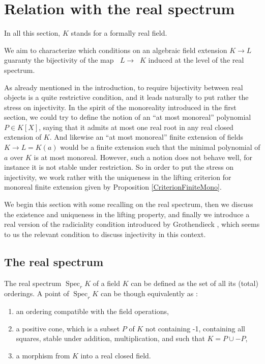 \documentclass[12pt]{amsart}
\theoremstyle{definition}
\DeclareMathOperator{\Sp}{Spec}
\DeclareMathOperator{\Spr}{Spec_r}
\begin{document}

\section{Relation with the real spectrum}\label{sec-sper}

In all this section, $K$ stands for a formally real field.

We aim to characterize which conditions on an algebraic field extension $K\to L$ guaranty the bijectivity of the map $\Spr L \to \Spr K$ induced at the level of the real spectrum.


As already mentioned in the introduction, to require bijectivity between real objects is a quite restrictive condition, and it leads naturally to put rather the stress on injectivity. In the spirit of the monoreality introduced in the first section, we could try  to define the notion of an 
``at most monoreal'' polynomial $P\in K[X]$, saying that it admits at most one real root in any real closed extension of $K$. And likewise an ``at most monoreal'' finite extension of fields $K\to L=K(a)$ would be a finite extension such that the minimal polynomial of $a$ over $K$ is at most monoreal. However, such a notion does not behave well, for instance it is not stable under restriction.
So in order to put the stress on injectivity, we work rather with the uniqueness in the lifting criterion for monoreal finite extension given by Proposition \ref{CriterionFiniteMono}. 

We begin this section with some recalling on the real spectrum, then we discuss the existence and uniqueness in the lifting property, and finally we introduce a real version of the radiciality condition introduced by Grothendieck \cite{Gr1}, which seems to us the relevant condition to discuss injectivity in this context.

\subsection{The real spectrum}

The real spectrum $\Sp_r K$ of a field $K$ can be defined as the set of all its (total) orderings. A point of $\Sp_r K$ can be though equivalently as :
\begin{enumerate}
\item an ordering compatible with the field operations, 
\item a positive cone, which is a subset $P$ of $K$ not containing -1, containing all squares, stable under addition, multiplication, and such that $K=P\cup -P$,  
\item a morphism from $K$ into a real closed field.
\end{enumerate}
\end{document}
